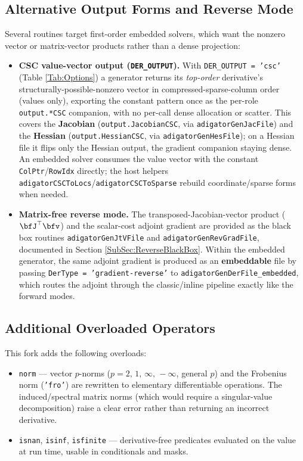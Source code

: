 \documentclass[10pt,pdftex]{article}
\begin{document}
\subsection{Alternative Output Forms and Reverse Mode}\label{SubSec:OutputForms}
Several routines target first-order embedded solvers, which want the nonzero vector or matrix-vector products rather than a dense projection:
\begin{itemize}
\item {\bf CSC value-vector output (\texttt{DER\_OUTPUT}).} With \texttt{DER\_OUTPUT = 'csc'} (Table \ref{Tab:Options}) a generator returns its {\em top-order} derivative's structurally-possible-nonzero vector in compressed-sparse-column order (values only), exporting the constant pattern once as the per-role \texttt{output.*CSC} companion, with no per-call dense allocation or scatter. This covers the {\bf Jacobian} (\texttt{output.JacobianCSC}, via \texttt{adigatorGenJacFile}) and the {\bf Hessian} (\texttt{output.HessianCSC}, via \texttt{adigatorGenHesFile}); on a Hessian file it flips only the Hessian output, the gradient companion staying dense. An embedded solver consumes the value vector with the constant \texttt{ColPtr}/\texttt{RowIdx} directly; the host helpers \texttt{adigatorCSCToLocs}/\texttt{adigatorCSCToSparse} rebuild coordinate/sparse forms when needed.
\item {\bf Matrix-free reverse mode.} The transposed-Jacobian-vector product ($\bfJ^\top\bfv$) and the scalar-cost adjoint gradient are provided as the black box routines \texttt{adigatorGenJtVFile} and \texttt{adigatorGenRevGradFile}, documented in Section \ref{SubSec:ReverseBlackBox}. Within the embedded generator, the same adjoint gradient is produced as an {\bf embeddable} file by passing \texttt{DerType = 'gradient-reverse'} to \texttt{adigatorGenDerFile\_embedded}, which routes the adjoint through the classic/inline pipeline exactly like the forward modes.
\end{itemize}

\subsection{Additional Overloaded Operators}\label{SubSec:Operators}
This fork adds the following overloads:
\begin{itemize}
\item \texttt{norm} --- vector $p$-norms ($p = 2,\,1,\,\infty,\,-\infty$, general $p$) and the Frobenius norm (\texttt{'fro'}) are rewritten to elementary differentiable operations. The induced/spectral matrix norms (which would require a singular-value decomposition) raise a clear error rather than returning an incorrect derivative.
\item \texttt{isnan}, \texttt{isinf}, \texttt{isfinite} --- derivative-free predicates evaluated on the value at run time, usable in conditionals and masks.
\end{itemize}
\end{document}
